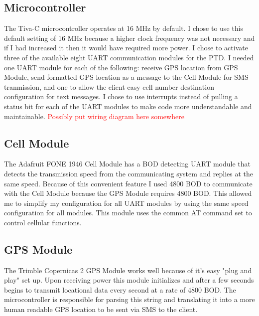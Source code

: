 \documentclass[11pt]{article}
\begin{document}
\subsection{Microcontroller} 
The Tiva-C microcontroller operates at 16 MHz by default. I chose to use this default setting of 16 MHz because a higher clock frequency was not necessary and 
if I had increased it then it would have required more power. I chose to activate three of the available eight UART communication modules for the PTD. I needed 
one UART module for each of the following: receive GPS location from GPS Module, send formatted GPS location as a message to the Cell Module for SMS tranmission,
and one to allow the client easy cell number destination configuration for text messages. I chose to use interrupts instead of pulling a status bit for each of
the UART modules to make code more understandable and maintainable. \textcolor{Red}{Possibly put wiring diagram here somewhere}  


\subsection{Cell Module}
The Adafruit FONE 1946 Cell Module has a BOD detecting UART module that detects the transmission speed from the communicating system and 
replies at the same speed. Because of this convenient feature I used 4800 BOD to communicate with the Cell Module because the GPS Module requires 4800 BOD. This 
allowed me to simplify my configuration for all UART modules by using the same speed configuration for all modules. This module uses the common AT command set to
control cellular functions. 


\subsection{GPS Module}
The Trimble Copernicas 2 GPS Module works well because of it's easy "plug and play" set up. Upon receiving power this module initializes and after a few seconds begins
to transmit locational data every second at a rate of 4800 BOD. The microcontroller is responsible for parsing this string and translating it into a more human readable GPS location 
to be sent via SMS to the client.  
\end{document}
